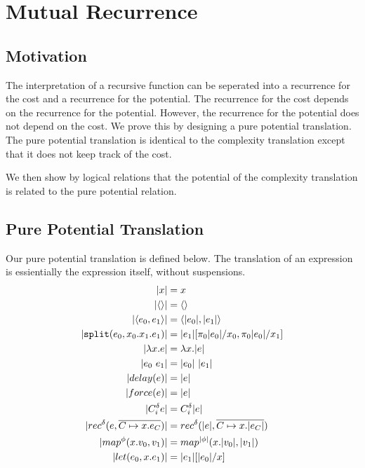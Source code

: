\chapter{Mutual Recurrence}

\section{Motivation}
The interpretation of a recursive function can be seperated into a recurrence
for the cost and a recurrence for the potential. The recurrence for the cost
depends on the recurrence for the potential. However, the recurrence for the
potential does not depend on the cost. We prove this by designing a pure
potential translation. The pure potential translation is identical to the
complexity translation except that it does not keep track of the cost.

We then show by logical relations that the potential of the complexity
translation is related to the pure potential relation.

\section{Pure Potential Translation}
Our pure potential translation is defined below. The translation of an
expression is essientially the expression itself, without suspensions.
%
\begin{align*}
  |x| &= x                                                                                     \\
  |\LP\RP| &= \LP\RP                                                           \\
  |\LP e_0, e_1 \RP | &= \LP |e_0|, |e_1| \RP                                  \\
  |\texttt{split}(e_0, x_0. x_1. e_1)| &= |e_1|[\pi_0|e_0|/x_0, \pi_0|e_0|/x_1]                \\
  |\lambda x.e | &= \lambda x.|e|                                                              \\
  |e_0\ e_1| &= |e_0|\ |e_1|                                                                   \\
  |delay(e)| &= |e|                                                                            \\
  |force(e)| &= |e|                                                                            \\
  |C_i^\delta e| &= C_i^\delta |e|                                                             \\
  |rec^\delta(e, \overline{C \mapsto x.e_C})| &= rec^\delta(|e|, \overline{C \mapsto x.|e_C|}) \\
  |map^\phi(x.v_0, v_1)| &= map^{|\phi|}(x.|v_0|, |v_1|)                                       \\
  |let(e_0, x.e_1)| &= |e_1|[|e_0|/x]
\end{align*}
%
